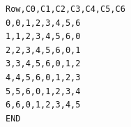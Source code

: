\begin{verbatim}
Row,C0,C1,C2,C3,C4,C5,C6
0,0,1,2,3,4,5,6
1,1,2,3,4,5,6,0
2,2,3,4,5,6,0,1
3,3,4,5,6,0,1,2
4,4,5,6,0,1,2,3
5,5,6,0,1,2,3,4
6,6,0,1,2,3,4,5
END
\end{verbatim}
